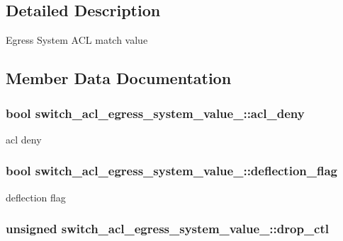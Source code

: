 \subsection{Detailed Description}
Egress System A\+C\+L match value 

\subsection{Member Data Documentation}
\hypertarget{unionswitch__acl__egress__system__value___a0dc0fadd3d25bed24df88b5104473850}{
\subsubsection[{acl\+\_\+deny}]{\setlength{\rightskip}{0pt plus 5cm}bool switch\+\_\+acl\+\_\+egress\+\_\+system\+\_\+value\+\_\+\+::acl\+\_\+deny}}\label{unionswitch__acl__egress__system__value___a0dc0fadd3d25bed24df88b5104473850}
acl deny \hypertarget{unionswitch__acl__egress__system__value___ae767ded6ca7e3792830062fe82ce0c0c}{
\subsubsection[{deflection\+\_\+flag}]{\setlength{\rightskip}{0pt plus 5cm}bool switch\+\_\+acl\+\_\+egress\+\_\+system\+\_\+value\+\_\+\+::deflection\+\_\+flag}}\label{unionswitch__acl__egress__system__value___ae767ded6ca7e3792830062fe82ce0c0c}
deflection flag \hypertarget{unionswitch__acl__egress__system__value___adab6d2bf1ddc723d450c8d63ffc6c395}{
\subsubsection[{drop\+\_\+ctl}]{\setlength{\rightskip}{0pt plus 5cm}unsigned switch\+\_\+acl\+\_\+egress\+\_\+system\+\_\+value\+\_\+\+::drop\+\_\+ctl}}\label{unionswitch__acl__egress__system__value___adab6d2bf1ddc723d450c8d63ffc6c395}
